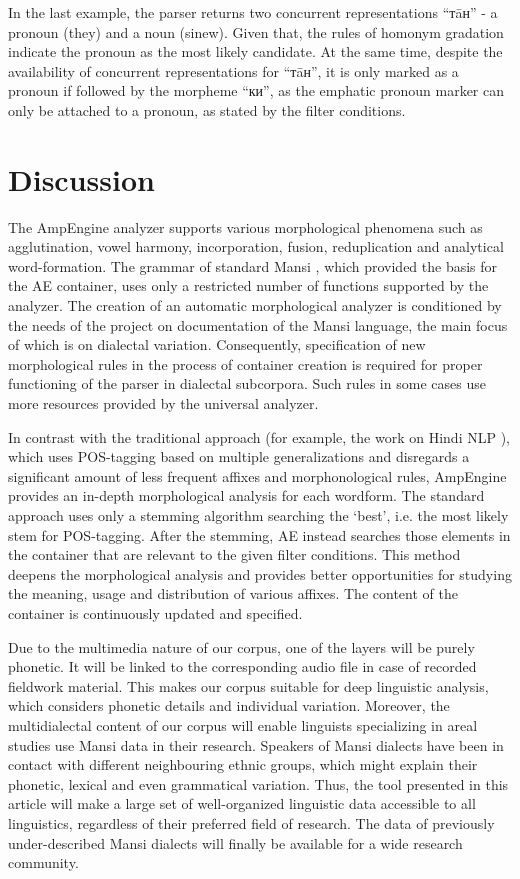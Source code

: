 \documentclass[b5paper,notitlepage]{article}
\begin{document}
In the last example, the parser returns two concurrent representations “тāн” - a pronoun (they) and a noun (sinew). Given that, the rules of homonym gradation indicate the pronoun as the most likely candidate. At the same time, despite the availability of concurrent representations for  “тāн”, it is only marked as a pronoun if followed by the morpheme “ки”, as the emphatic pronoun marker can only be attached to a pronoun, as stated by the filter conditions.  

\section{Discussion}
The AmpEngine analyzer supports various morphological phenomena such as agglutination, vowel harmony, incorporation, fusion, reduplication and analytical word-formation. The grammar of standard Mansi \cite{Rombandeeva vogul}, which provided the basis for the AE container, uses only a restricted number of functions supported by the analyzer. 
The creation of an automatic morphological analyzer is conditioned by the needs of the project on documentation of the Mansi language, the main focus of which is on dialectal variation. Consequently, specification of new morphological rules in the process of container creation is required for proper functioning of the parser in dialectal subcorpora. Such rules in some cases use more resources provided by the universal analyzer. 

In contrast with the traditional approach (for example, the work on Hindi NLP \cite{Hindi}), which uses POS-tagging based on multiple generalizations and disregards a significant amount of less frequent affixes and morphonological rules, AmpEngine provides an in-depth morphological analysis for each wordform.  
The standard approach uses only a stemming algorithm searching the ‘best’, i.e. the most likely stem for POS-tagging. After the stemming, AE instead searches those elements in the container that are relevant to the given filter conditions. This method deepens the morphological analysis and provides better opportunities for studying the meaning, usage and distribution of various affixes. The content of the container is continuously updated and specified. 

Due to the multimedia nature of our corpus, one of the layers will be purely phonetic. It will be linked to the corresponding audio file in case of recorded fieldwork material. This makes our corpus suitable for deep linguistic analysis, which considers phonetic details and individual variation.
Moreover, the multidialectal content of our corpus will enable linguists specializing in areal studies use Mansi data in their research. Speakers of Mansi dialects have been in contact with different neighbouring ethnic groups, which might explain their phonetic, lexical and even grammatical variation. 
Thus, the tool presented in this article will make a large set of well-organized linguistic data accessible to all linguistics, regardless of their preferred field of research. The data of previously under-described Mansi dialects will finally be available for a wide research community.  
\end{document}
